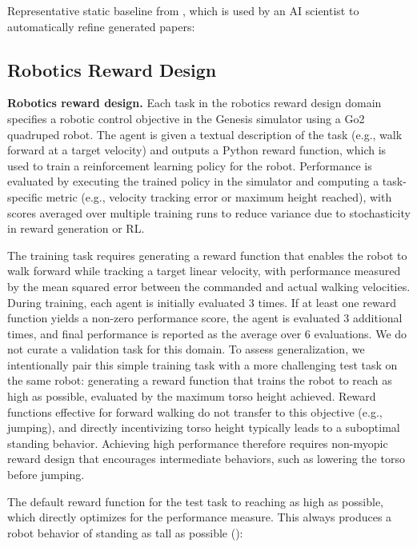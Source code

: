 \documentclass[]{fairmeta}
\begin{document}
Representative static baseline from \citet{yamada2025ai}, which is used by an AI scientist to automatically refine generated papers:


\subsection{Robotics Reward Design}
\label{app:domain-genesis}

\textbf{Robotics reward design.}
Each task in the robotics reward design domain specifies a robotic control objective in the Genesis simulator \citep{genesis2024} using a Go2 quadruped robot. The agent is given a textual description of the task (e.g., walk forward at a target velocity) and outputs a Python reward function, which is used to train a reinforcement learning policy \citep[i.e., PPO,][]{schulman2017proximal} for the robot. Performance is evaluated by executing the trained policy in the simulator and computing a task-specific metric (e.g., velocity tracking error or maximum height reached), with scores averaged over multiple training runs to reduce variance due to stochasticity in reward generation or RL.

The training task requires generating a reward function that enables the robot to walk forward while tracking a target linear velocity, with performance measured by the mean squared error between the commanded and actual walking velocities. During training, each agent is initially evaluated 3 times. If at least one reward function yields a non-zero performance score, the agent is evaluated 3 additional times, and final performance is reported as the average over 6 evaluations. We do not curate a validation task for this domain. To assess generalization, we intentionally pair this simple training task with a more challenging test task on the same robot: generating a reward function that trains the robot to reach as high as possible, evaluated by the maximum torso height achieved. Reward functions effective for forward walking do not transfer to this objective (e.g., jumping), and directly incentivizing torso height typically leads to a suboptimal standing behavior. Achieving high performance therefore requires non-myopic reward design that encourages intermediate behaviors, such as lowering the torso before jumping.

The default reward function for the test task to reaching as high as possible, which directly optimizes for the performance measure. This always produces a robot behavior of standing as tall as possible ():

\end{document}
